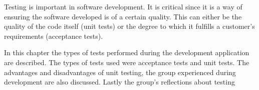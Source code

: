 Testing is important in software development. It is critical since it is a way of ensuring the software developed is of a certain quality. This can either be the quality of the code itself (unit tests) or the degree to which it fulfills a customer's requirements (acceptance tests).  

In this chapter the types of tests performed during the development application are described. The types of tests used were acceptance tests and unit tests. The advantages and disadvantages of unit testing, the group experienced during development are also discussed. Lastly the group's reflections about testing 
